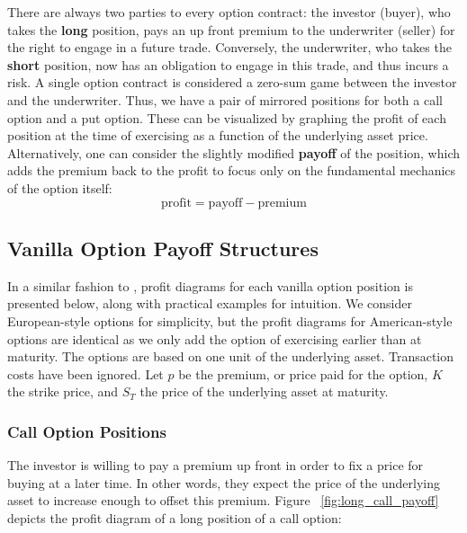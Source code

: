 \documentclass[english,12pt,a4paper,pdftex,sci,utf8]{aaltothesis}
\begin{document}
There are always two parties to every option contract: the investor (buyer), who takes the \textbf{long} position, pays an up front premium to the underwriter (seller) for the right to engage in a future trade. Conversely, the underwriter, who takes the \textbf{short} position, now has an obligation to engage in this trade, and thus incurs a risk. A single option contract is considered a zero-sum game between the investor and the underwriter. Thus, we have a pair of mirrored positions for both a call option and a put option. These can be visualized by graphing the profit of each position at the time of exercising as a function of the underlying asset price. Alternatively, one can consider the slightly modified \textbf{payoff} of the position, which adds the premium back to the profit to focus only on the fundamental mechanics of the option itself:
\begin{equation}
    \text{profit}=\text{payoff}-\text{premium}
\end{equation}

\subsection{Vanilla Option Payoff Structures}\label{payoffs}


In a similar fashion to \cite[pp. 7-10]{hull2016options}, profit diagrams for each vanilla option position is presented below, along with practical examples for intuition. We consider European-style options for simplicity, but the profit diagrams for American-style options are identical as we only add the option of exercising earlier than at maturity. The options are based on one unit of the underlying asset. Transaction costs have been ignored. Let $p$ be the premium, or price paid for the option, $K$ the strike price, and $S_T$ the price of the underlying asset at maturity.



\subsubsection{Call Option Positions}
The investor is willing to pay a premium up front in order to fix a price for buying at a later time. In other words, they expect the price of the underlying asset to increase enough to offset this premium. Figure ~\ref{fig:long_call_payoff} depicts the profit diagram of a long position of a call option:
\end{document}
